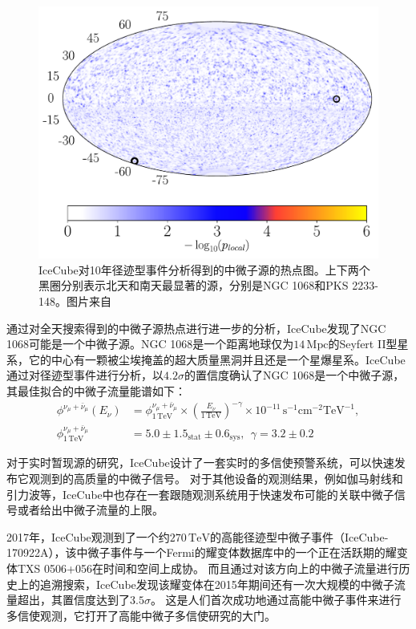 \begin{figure}[htbp]
    \centering
    \includegraphics[width=0.6\linewidth]{img/IceCube_10yr_source_hotspot.pdf}
    \caption{IceCube对10年径迹型事件分析得到的中微子源的热点图。上下两个黑圈分别表示北天和南天最显著的源，分别是NGC 1068和PKS 2233-148。图片来自\cite{IceCube_10yr_point_source:2019}}
    \label{fig:IceCube_10yr_source_hotspot}
\end{figure}

通过对全天搜索得到的中微子源热点进行进一步的分析，IceCube发现了NGC 1068可能是一个中微子源\cite{IceCube_NGC1068:2022}。NGC 1068是一个距离地球仅为$14\,\mathrm{Mpc}$的Seyfert II型星系，它的中心有一颗被尘埃掩盖的超大质量黑洞\cite{Rosas_NGC_1068:2021}并且还是一个星爆星系。IceCube通过对径迹型事件进行分析，以$4.2\sigma$的置信度确认了NGC 1068是一个中微子源，其最佳拟合的中微子流量能谱如下：
\begin{equation}
\begin{aligned}
    \phi^{\nu_\mu+\bar{\nu}_\mu}(E_\nu) &= 
    \phi^{\nu_\mu+\bar{\nu}_\mu}_\mathrm{1\,TeV} 
    \times \left( \frac{E_\nu}{1\,\mathrm{TeV}} \right)^{-\gamma} 
    \times 10^{-11} \, \mathrm{s^{-1} cm^{-2} TeV^{-1}}, \\
    \phi^{\nu_\mu+\bar{\nu}_\mu}_\mathrm{1\,TeV} &= 
    5.0 \pm 1.5_\mathrm{stat} \pm 0.6_\mathrm{sys}, ~~
    \gamma = 3.2 \pm 0.2
    \label{eq:spectrum_NGC1068}
\end{aligned}
\end{equation}

对于实时暂现源的研究，IceCube设计了一套实时的多信使预警系统\cite{IceCube_alert:2016, IceCube_alert:2019}，可以快速发布它观测到的高质量的中微子信号。
对于其他设备的观测结果，例如伽马射线和引力波等，IceCube中也存在一套跟随观测系统\cite{IceCube_follow_up:2020}用于快速发布可能的关联中微子信号或者给出中微子流量的上限。

2017年，IceCube观测到了一个约$270\,\mathrm{TeV}$的高能径迹型中微子事件（IceCube-170922A），该中微子事件与一个Fermi的耀变体数据库中的一个正在活跃期的耀变体TXS 0506+056在时间和空间上成协\cite{TXS_0506_MM:2018}。
而且通过对该方向上的中微子流量进行历史上的追溯搜索，IceCube发现该耀变体在2015年期间还有一次大规模的中微子流量超出，其置信度达到了$3.5\sigma$\cite{TXS_0506_flare:2018}。
这是人们首次成功地通过高能中微子事件来进行多信使观测，它打开了高能中微子多信使研究的大门。

